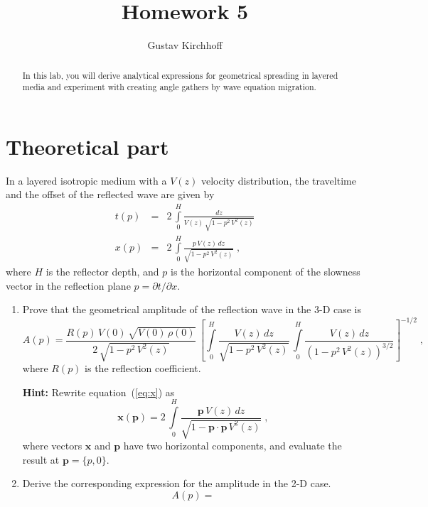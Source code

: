 \author{Gustav Kirchhoff}
\title{Homework 5}

\begin{abstract}
In this lab, you will derive analytical expressions for geometrical
spreading in layered media and experiment with creating angle gathers
by wave equation migration.
\end{abstract}


\section{Theoretical part}

In a layered isotropic medium with a $V(z)$ velocity distribution, the
traveltime and the offset of the reflected wave are given by
\begin{eqnarray}
  \label{eq:t}
  t(p) & = & 2\,\int\limits_{0}^{H} \frac{d z}{V(z)\,\sqrt{1-p^2\,V^2(z)}} \\
  \label{eq:x}
  x(p) & = & 2\,\int\limits_{0}^{H} \frac{p\,V(z)\,d z}{\sqrt{1-p^2\,V^2(z)}}\;,
\end{eqnarray}
where $H$ is the reflector depth, and $p$ is the horizontal component
of the slowness vector in the reflection plane $p = \partial
t/\partial x$. 

\begin{enumerate}
\item Prove that the geometrical amplitude of the reflection
  wave in the 3-D case is
\begin{equation}
  A(p) = \frac{R(p)\,V(0)\,\sqrt{V(0)\,\rho(0)}}{2\,\sqrt{1-p^2\,V^2(z)}}\,%
    \left[\int\limits_{0}^{H} \frac{V(z)\,d z}{\sqrt{1-p^2\,V^2(z)}}\,
      \int\limits_{0}^{H} \frac{V(z)\,d z}{\left(1-p^2\,V^2(z)\right)^{3/2}}
    \right]^{-1/2}\;,
\label{eq:a3}
\end{equation}
where $R(p)$ is the reflection coefficient.

\textbf{Hint:} Rewrite equation~(\ref{eq:x}) as
\begin{equation}
  \label{eq:x3}
  \mathbf{x}(\mathbf{p}) = 2\,\int\limits_{0}^{H} \frac{\mathbf{p}\,V(z)\,d z}{\sqrt{1-\mathbf{p} \cdot \mathbf{p}\,V^2(z)}}\;,
\end{equation}
where vectors $\mathbf{x}$ and $\mathbf{p}$ have two horizontal
components, and evaluate the result at $\mathbf{p}=\{p,0\}$.
 
\item Derive the corresponding expression for the amplitude in the 2-D case.
\begin{equation}
  \label{eq:a2}
  A(p) =
\end{equation}

\end{enumerate}

